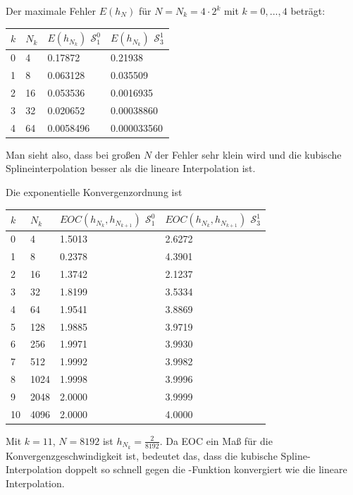 \documentclass[ngerman,a4paper]{texmf/tex/latex/mathscript/mathscript}
\begin{document}
	Der maximale Fehler $E(h_N)$ für $N=N_k=4\cdot 2^k$ mit $k=0,...,4$ beträgt:
	\begin{center}
		\begin{tabular}{ll|l|l}
			$k$ & $N_k$ & $E(h_{N_k})$ $\mathcal{S}_1^0$ & $E(h_{N_k})$ $\mathcal{S}_3^1$ \\
			\hline
			0 & 4 & 0.17872 & 0.21938 \\
			\hline
			1 & 8 & 0.063128 & 0.035509 \\
			\hline 
			2 & 16 & 0.053536  & 0.0016935\\
			\hline 
			3 & 32 & 0.020652  & 0.00038860\\
			\hline 
			4 & 64 & 0.0058496 & 0.000033560\\
		\end{tabular}
	\end{center} 

Man sieht also, dass bei großen $N$ der Fehler sehr klein wird und die kubische Splineinterpolation besser als die lineare Interpolation ist.

Die exponentielle Konvergenzordnung ist
\begin{center}
	\begin{tabular}{ll|l|l}
		$k$ & $N_k$ & $EOC(h_{N_k},h_{N_{k+1}})$ $\mathcal{S}_1^0$ & $EOC(h_{N_k},h_{N_{k+1}})$ $\mathcal{S}_3^1$ \\
		\hline
		0 & 4 & 1.5013 & 2.6272\\
		\hline
		1 & 8 & 0.2378 & 4.3901\\
		\hline
		2 & 16 & 1.3742 & 2.1237\\
		\hline
		3 & 32 & 1.8199 & 3.5334\\
		\hline
		4 & 64 & 1.9541 & 3.8869\\
		\hline
		5 & 128 & 1.9885 & 3.9719\\
		\hline
		6 & 256 & 1.9971 & 3.9930\\
		\hline
		7 & 512 & 1.9992 & 3.9982\\
		\hline
		8 & 1024 & 1.9998 & 3.9996\\
		\hline
		9 & 2048 & 2.0000 & 3.9999\\
		\hline
		10 & 4096 & 2.0000 & 4.0000\\
		\hline
	\end{tabular}
\end{center}

Mit $k=11$, $N=8192$ ist $h_{N_k}= \frac{2}{8192}$. Da EOC ein Maß für die Konvergenzgeschwindigkeit ist, bedeutet das, dass die kubische Spline-Interpolation doppelt so schnell gegen die -Funktion konvergiert wie die lineare Interpolation.
\end{document}

